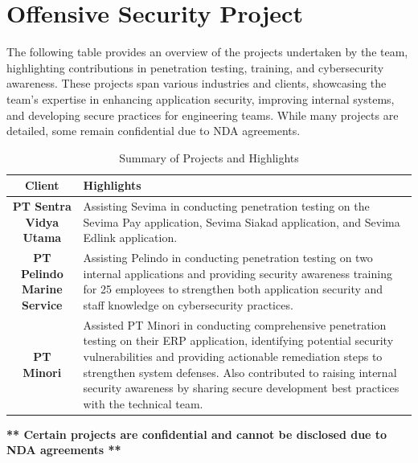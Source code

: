 \documentclass[10pt, letterpaper]{article}
\begin{document}
	\section{Offensive Security Project}
		 \vspace{0.2 cm}
	\begin{justify}
		The following table provides an overview of the projects undertaken by the team, highlighting contributions in penetration testing, training, and cybersecurity awareness. These projects span various industries and clients, showcasing the team's expertise in enhancing application security, improving internal systems, and developing secure practices for engineering teams. While many projects are detailed, some remain confidential due to NDA agreements.
	\end{justify}

	\begin{table}[ht]
		\centering
		\begin{tabular}{|c|p{11cm}|}
			\hline
			\textbf{Client} & \textbf{Highlights} \\ \hline
			
			\textbf{PT Sentra Vidya Utama} & 
			Assisting Sevima in conducting penetration testing on the Sevima Pay application, Sevima Siakad application, and Sevima Edlink application. \\ \hline
			
			\textbf{PT Pelindo Marine Service} & 
			Assisting Pelindo in conducting penetration testing on two internal applications and providing security awareness training for 25 employees to strengthen both application security and staff knowledge on cybersecurity practices. \\ \hline
			
			\textbf{PT Minori} & 
			Assisted PT Minori in conducting comprehensive penetration testing on their ERP application, identifying potential security vulnerabilities and providing actionable remediation steps to strengthen system defenses. Also contributed to raising internal security awareness by sharing secure development best practices with the technical team. \\ \hline
		\end{tabular}
		\caption{Summary of Projects and Highlights}
		\label{tab:projects_highlights}
	\end{table}
	
	\vspace{0.3cm}
	\noindent \textbf{** Certain projects are confidential and cannot be disclosed due to NDA agreements **}
	
\end{document}
